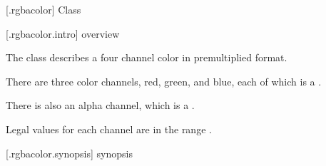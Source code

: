  [\iotwod.rgbacolor] {Class }

 [\iotwod.rgbacolor.intro] { overview}

\pnum
{}%
The class  describes a four channel color in premultiplied format.

\pnum
There are three color channels, red, green, and blue, each of which is a .

\pnum
There is also an alpha channel, which is a .

\pnum
Legal values for each channel are in the range .

%
 [\iotwod.rgbacolor.synopsis] { synopsis}

